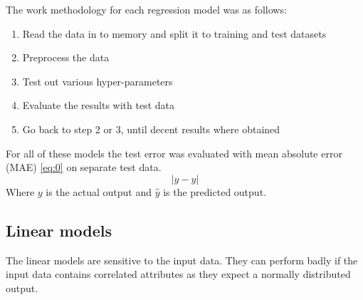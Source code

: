 \documentclass[a4paper]{article}
\begin{document}
The work methodology for each regression model was as follows:
\begin{enumerate}
  \item Read the data in to memory and split it to training and test datasets
  \item Preprocess the data
  \item Test out various hyper-parameters
  \item Evaluate the results with test data
  \item Go back to step 2 or 3, until decent results where obtained
\end{enumerate}
For all of these models the test error was evaluated with mean absolute error (MAE) \ref{eq:0} on separate test data.
\begin{equation} \label{eq:0}
|y - \hat{y}|
\end{equation}
Where $y$ is the actual output and $\hat{y}$ is the predicted output.

\subsection{Linear models}
The linear models are sensitive to the input data. They can perform badly if the input data contains correlated attributes as they expect a normally distributed output.
\end{document}
